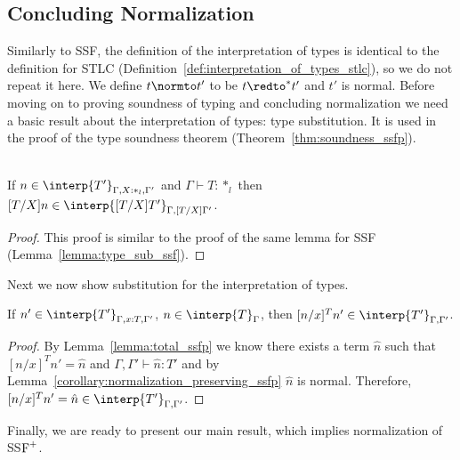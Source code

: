 \subsection{Concluding Normalization}
\label{subsec:concluding_normalization_ssfp}
Similarly to SSF, the definition of the interpretation of types is
identical to the definition for STLC
(Definition~\ref{def:interpretation_of_types_stlc}), so we do not
repeat it here.  We define $t \normto t'$ to be $t \redto^{*} t'$ and
$t'$ is normal.  Before moving on to proving soundness of typing and
concluding normalization we need a basic result about the
interpretation of types: type substitution.  It is used in the proof
of the type soundness theorem (Theorem~\ref{thm:soundness_ssfp}).

\begin{lemma}
  \ \\
  If $n \in \interp{T'}_{\Gamma,X:*_l,\Gamma'}$ and 
  $\Gamma \vdash T:*_l$ then 
  $[T/X]n \in \interp{[T/X]T'}_{\Gamma,[T/X]\Gamma'}$.
  \label{lemma:type_sub_ssfp}
\end{lemma}
\begin{proof}
  This proof is similar to the proof of the same lemma for SSF (Lemma~\ref{lemma:type_sub_ssf}).
\end{proof}
\noindent
Next we now show substitution for the interpretation of types.
\begin{lemma}
  If $n' \in \interp{T'}_{\Gamma,x:T,\Gamma'}$, $n \in \interp{T}_\Gamma$, then 
  $[n/x]^T n' \in \interp{T'}_{\Gamma,\Gamma'}$.
  \label{lemma:interpretation_of_types_closed_substitution_ssfp}
\end{lemma}
\begin{proof}
  By Lemma~\ref{lemma:total_ssfp} we know there exists a term $\hat{n}$ 
  such that $[n/x]^T n' = \hat{n}$ and $\Gamma,\Gamma' \vdash \hat{n}:T'$ and by 
  Lemma~\ref{corollary:normalization_preserving_ssfp} $\hat{n}$ is normal.  Therefore,
  $[n/x]^T n' = \hat{n} \in \interp{T'}_{\Gamma,\Gamma'}$.
\end{proof}
\noindent
Finally, we are ready to present our main result, which implies
normalization of SS$\mbox{F}^{+}$.


